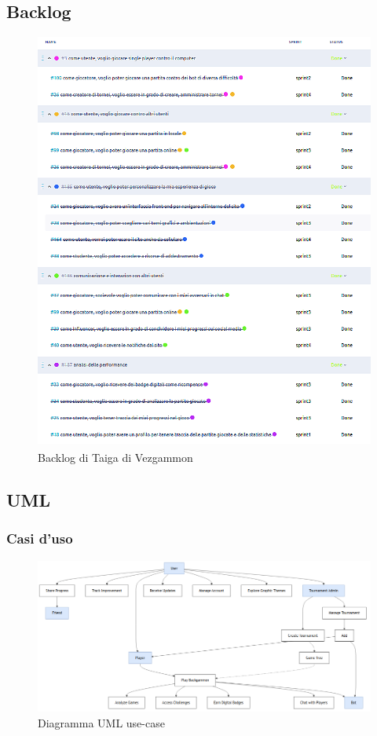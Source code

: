 \documentclass{article}
\begin{document}
\subsection{Backlog} \label{sec:bl}
\begin{figure}[H]
    \centering
    \includegraphics[width=1\textwidth]{backlog}
    \caption{Backlog di Taiga di Vezgammon\textsuperscript{\texttrademark}}
    \label{fig:backlog}
\end{figure}

\subsection{UML}
\subsubsection{Casi d'uso}

\begin{figure}[H]
    \centering
    \includegraphics[width=1\textwidth]{uml-usecase}
    \caption{Diagramma UML use-case}
    \label{fig:use-case}
\end{figure}
\end{document}

